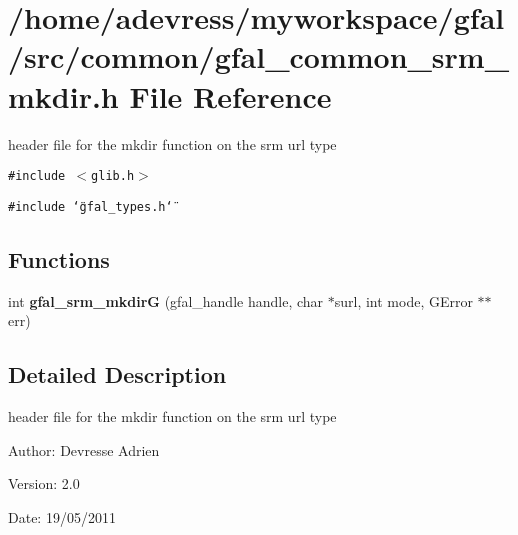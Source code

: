 \section{/home/adevress/myworkspace/gfal/src/common/gfal\_\-common\_\-srm\_\-mkdir.h File Reference}
\label{gfal__common__srm__mkdir_8h}
header file for the mkdir function on the srm url type 

{\tt \#include $<$glib.h$>$}\par
{\tt \#include \char`\"{}gfal\_\-types.h\char`\"{}}\par
\subsection*{Functions}
\begin{CompactItemize}
\item 
int \textbf{gfal\_\-srm\_\-mkdir\-G} (gfal\_\-handle handle, char $\ast$surl, int mode, GError $\ast$$\ast$err)\label{gfal__common__srm__mkdir_8h_b7f321a0f5aea284d6c711e0b88749e3}

\end{CompactItemize}


\subsection{Detailed Description}
header file for the mkdir function on the srm url type 

\begin{Desc}
\item[Author:]Devresse Adrien \end{Desc}
\begin{Desc}
\item[Version:]2.0 \end{Desc}
\begin{Desc}
\item[Date:]19/05/2011 \end{Desc}
